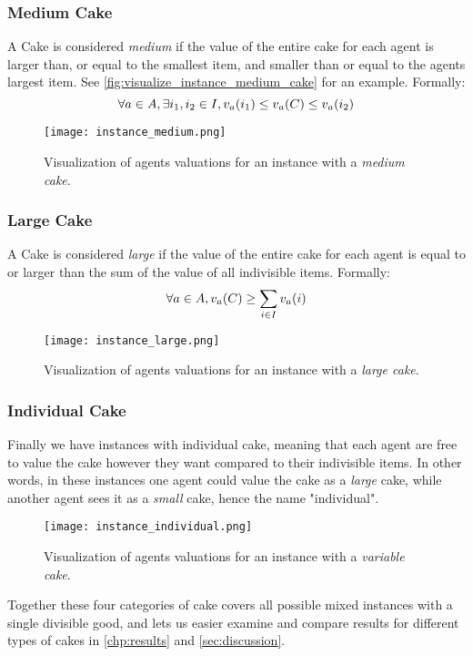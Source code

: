 \subsubsection*{Medium Cake}\label{subsubsec:medium-cake}
A Cake is considered \textit{medium} if the value of the entire cake for each agent is larger than, or equal to the smallest item, and smaller than or equal to the agents largest item. See \autoref{fig:visualize_instance_medium_cake} for an example. Formally:
$$\forall a\in A, \exists i_1,i_2\in I, v_a(i_1)\leq v_a(C)\leq v_a(i_2)$$
\begin{figure}
    \centering
    \texttt{[image: instance\_medium.png]}
    \caption{Visualization of agents valuations for an instance with a \textit{medium cake}.}
    \label{fig:visualize_instance_medium_cake}
\end{figure}

\subsubsection*{Large Cake}\label{subsubsec:large-cake}
A Cake is considered \textit{large} if the value of the entire cake for each agent is equal to or larger than the sum of the value of all indivisible items. Formally: 
$$\forall a\in A, v_a(C)\geq \sum_{i\in I}v_a(i)$$
\begin{figure}
    \centering
    \texttt{[image: instance\_large.png]}
    \caption{Visualization of agents valuations for an instance with a \textit{large cake}.}
    \label{fig:visualize_instance_large_cake}
\end{figure}

\subsubsection{Individual Cake}\label{subsubsec:individual-cake}
Finally we have instances with individual cake, meaning that each agent are free to value the cake however they want compared to their indivisible items. In other words, in these instances one agent could value the cake as a \textit{large} cake, while another agent sees it as a \textit{small} cake, hence the name "individual".
\begin{figure}
    \centering
    \texttt{[image: instance\_individual.png]}
    \caption{Visualization of agents valuations for an instance with a \textit{variable cake}.}
    \label{fig:visualize_instance_variable_cake}
\end{figure}

Together these four categories of cake covers all possible mixed instances with a single divisible good, and lets us easier examine and compare results for different types of cakes in \autoref{chp:results} and \autoref{sec:discussion}.